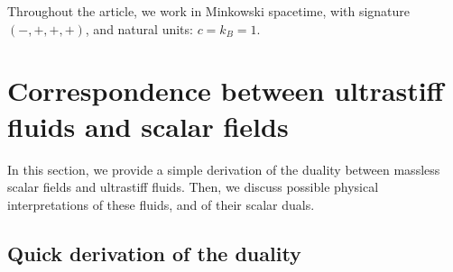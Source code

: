 \documentclass[a4paper, amsfonts, amssymb, amsmath, reprint, showkeys, nofootinbib, twoside,notitlepage,onecolumn]{revtex4-2}
\theoremstyle{definition}
\theoremstyle{theorem}
\theoremstyle{corollary}
\begin{document}
Throughout the article, we work in Minkowski spacetime, with signature $(-,+,+,+)$, and natural units: $c=k_B=1$.
\newpage






\section{Correspondence between ultrastiff fluids and scalar fields}\label{dualz}

In this section, we provide a simple derivation of the duality between massless scalar fields and ultrastiff fluids. Then, we discuss possible physical interpretations of these fluids, and of their scalar duals.  

\subsection{Quick derivation of the duality}
\end{document}
